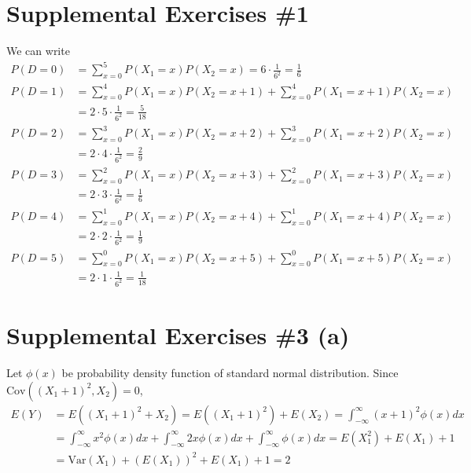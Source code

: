 \documentclass{scrartcl}
\begin{document}
\section{Supplemental Exercises \#1}
We can write
\begin{align*}
  P(D = 0)
  &= \sum^5_{x = 0} P(X_1 = x) P(X_2 = x)
  = 6 \cdot \frac{1}{6^2}
  = \frac{1}{6} \\
  P(D = 1)
  &= \sum^4_{x = 0} P(X_1 = x) P(X_2 = x + 1)
    + \sum^4_{x = 0} P(X_1 = x + 1) P(X_2 = x) \\
  &= 2 \cdot 5 \cdot \frac{1}{6^2}
  = \frac{5}{18} \\
  P(D = 2)
  &= \sum^3_{x = 0} P(X_1 = x) P(X_2 = x + 2)
    + \sum^3_{x = 0} P(X_1 = x + 2) P(X_2 = x) \\
  &= 2 \cdot 4 \cdot \frac{1}{6^2}
  = \frac{2}{9} \\
  P(D = 3)
  &= \sum^2_{x = 0} P(X_1 = x) P(X_2 = x + 3)
    + \sum^2_{x = 0} P(X_1 = x + 3) P(X_2 = x) \\
  &= 2 \cdot 3 \cdot \frac{1}{6^2}
  = \frac{1}{6} \\
  P(D = 4)
  &= \sum^1_{x = 0} P(X_1 = x) P(X_2 = x + 4)
    + \sum^1_{x = 0} P(X_1 = x + 4) P(X_2 = x) \\
  &= 2 \cdot 2 \cdot \frac{1}{6^2}
  = \frac{1}{9} \\
  P(D = 5)
  &= \sum^0_{x = 0} P(X_1 = x) P(X_2 = x + 5)
    + \sum^0_{x = 0} P(X_1 = x + 5) P(X_2 = x) \\
  &= 2 \cdot 1 \cdot \frac{1}{6^2}
  = \frac{1}{18}
\end{align*}

\section{Supplemental Exercises \#3 (a)}
Let \(\phi(x)\) be probability density function of standard normal
distribution. Since \(\mathrm{Cov}((X_1 + 1)^2, X_2) = 0\),
\begin{align*}
  E(Y)
  &= E((X_1 + 1)^2 + X_2)
  = E((X_1 + 1)^2) + E(X_2)
  = \int^\infty_{-\infty} (x + 1)^2 \phi(x) dx \\
  &= \int^\infty_{-\infty} x^2 \phi(x) dx + \int^\infty_{-\infty} 2x \phi(x) dx
    + \int^\infty_{-\infty} \phi(x) dx
  = E(X^2_1) + E(X_1) + 1 \\
  &= \mathrm{Var}(X_1) + (E(X_1))^2 + E(X_1) + 1
  = 2
\end{align*}
\end{document}
